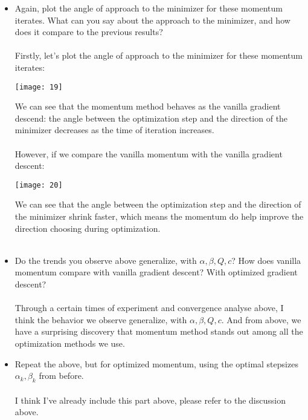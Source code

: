 \documentclass[11pt,letterpaper]{article}
\begin{document}
\newpage

\begin{tcolorbox}
    \begin{itemize}
        \item Again, plot the angle of approach to the minimizer for these momentum iterates. What can you say about the approach to the minimizer, and how does it compare to the previous results?
        \\\\
        Firstly, let's plot the angle  of approach to the minimizer for these momentum iterates:
        \begin{center}
            \texttt{[image: 19]}
        \end{center}
        We can see that the momentum method behaves as the vanilla gradient descend: the angle between the optimization step and the direction of the minimizer decreases as the time of iteration increases.\\\\
        However, if we compare the vanilla momentum with the vanilla gradient descent:
        \begin{center}
            \texttt{[image: 20]}
        \end{center}
        We can see that the angle between the optimization step and the direction of the minimizer shrink faster, which means the momentum do help improve the direction choosing during optimization.
        \\\\
        \item Do the trends you observe above generalize, with $\alpha, \beta, Q, c$? How does vanilla momentum compare with vanilla gradient descent? With optimized gradient descent?
        \\\\
        Through a certain times of experiment and convergence analyse above, I think the behavior we observe generalize, with $\alpha, \beta, Q, c$. And from above, we have a surprising discovery that momentum method stands out among all the optimization methods we use.
        \\
        \item Repeat the above, but for optimized momentum, using the optimal stepsizes $\alpha_k, \beta_k$ from before.
        \\\\
        I think I've already include this part above, please refer to the discussion above.
    \end{itemize}
\end{tcolorbox}
\end{document}
